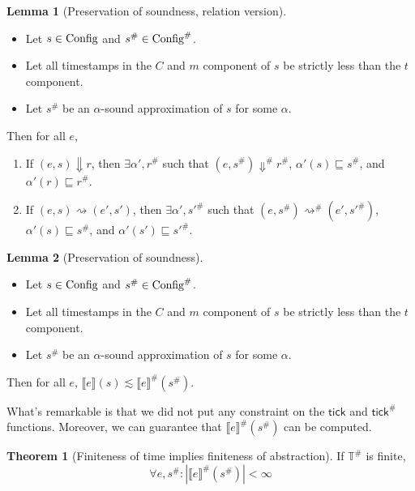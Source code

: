 \documentclass[acmsmall,screen]{acmart}
\theoremstyle{definition}
\newtheorem{lem}{Lemma}[section]
\newtheorem{thm}{Theorem}[section]
\newcommand*{\A}[1]{{#1}^{\#}}
\newcommand*{\Time}{\mathbb{T}}
\newcommand*{\ATime}{\A{\Time}}
\newcommand*{\mem}{m}
\newcommand*{\Config}[1]{\text{Config}\vphantom{#1}}
\newcommand*{\AConfig}[1]{\A{\text{Config}}\vphantom{#1}}
\newcommand*{\sembracket}[1]{\lBrack{#1}\rBrack}
\newcommand*{\tick}{\mathsf{tick}}
\begin{document}
\begin{lem}[Preservation of soundness, relation version]
  $\:$

  \begin{itemize}
    \item Let $s\in\Config{\Time}$ and $\A{s}\in\AConfig{\ATime}$.
    \item Let all timestamps in the $C$ and $\mem$ component of $s$ be strictly less than the $t$ component.
    \item Let $\A{s}$ be an $\alpha$-sound approximation of $s$ for some $\alpha$.
  \end{itemize}

  Then for all $e$,
  \begin{enumerate}
    \item If $(e,s)\Downarrow r$, then $\exists\alpha',\A{r}$ such that $(e,\A{s})\A\Downarrow\A{r}$, $\alpha'(s)\sqsubseteq\A{s}$, and $\alpha'(r)\sqsubseteq\A{r}$.
    \item If $(e,s)\rightsquigarrow (e',s')$, then $\exists\alpha', \A{s'}$ such that $(e,\A{s})\A\rightsquigarrow(e',\A{s'})$, $\alpha'(s)\sqsubseteq\A{s}$, and $\alpha'(s')\sqsubseteq\A{s'}$.
  \end{enumerate}
\end{lem}

\begin{lem}[Preservation of soundness]
  $\:$

  \begin{itemize}
    \item Let $s\in\Config{\Time}$ and $\A{s}\in\AConfig{\ATime}$.
    \item Let all timestamps in the $C$ and $\mem$ component of $s$ be strictly less than the $t$ component.
    \item Let $\A{s}$ be an $\alpha$-sound approximation of $s$ for some $\alpha$.
  \end{itemize}

  Then for all $e$, $\sembracket{e}(s)\lesssim\A{\sembracket{e}}(\A{s})$.
\end{lem}

What's remarkable is that we did not put any constraint on the $\tick$ and $\A{\tick}$ functions.
Moreover, we can guarantee that $\A{\sembracket{e}}(\A{s})$ can be computed.

\begin{thm}[Finiteness of time implies finiteness of abstraction]
  If $\ATime$ is finite,
  \[
    \forall e,\A{s}: |\A{\sembracket{e}}(\A{s})|<\infty
  \]
\end{thm}
\end{document}
